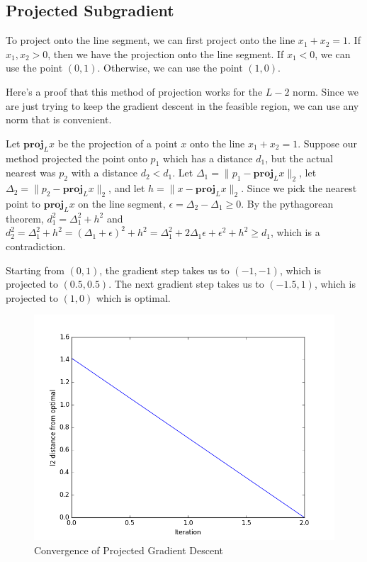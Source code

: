 \documentclass{article}
\newcommand{\proj}[2][]{\textbf{proj}_{#1}#2}
\newcommand\norm[1]{\|#1\|}
\begin{document}
\subsection{Projected Subgradient}

To project onto the line segment, we can first project onto the line $x_1 + x_2 = 1$. If $x_1,x_2 > 0$, then we have the projection onto the line segment. If $x_1 < 0$, we can use the point $(0, 1)$. Otherwise, we can use the point $(1, 0)$.

Here's a proof that this method of projection works for the $L-2$ norm. Since we are just trying to keep the gradient descent in the feasible region, we can use any norm that is convenient.

Let $\proj[L]{x}$ be the projection of a point $x$ onto the line $x_1 + x_2 = 1$. Suppose our method projected the point onto $p_1$ which has a distance $d_1$, but the actual nearest was $p_2$ with a distance $d_2 < d_1$. Let $\Delta_1 = \norm{p_1 - \proj[L]{x}}_2$, let $\Delta_2 = \norm{p_2 - \proj[L]{x}}_2$, and let $h = \norm{x - \proj[L]{x}}_2$. Since we pick the nearest point to $\proj[L]{x}$ on the line segment, $\epsilon = \Delta_2 - \Delta_1 \geq 0$. By the pythagorean theorem, $d_1^2 = \Delta_1^2 + h^2$ and $d_2^2 = \Delta_1^2 + h^2 = (\Delta_1 + \epsilon)^2 + h^2 = \Delta_1^2 + 2\Delta_1 \epsilon + \epsilon^2 + h^2 \geq d_1$, which is a contradiction.

Starting from $(0,1)$, the gradient step takes us to $(-1, -1)$, which is projected to $(0.5, 0.5)$. The next gradient step takes us to $(-1.5, 1)$, which is projected to $(1,0)$ which is optimal.

\begin{figure}[!ht]
  \centering
  \includegraphics[width=\textwidth,keepaspectratio=true]{projected-descent.png}
  \caption{Convergence of Projected Gradient Descent}
  \label{fig:projected-descent}
\end{figure}
\end{document}
